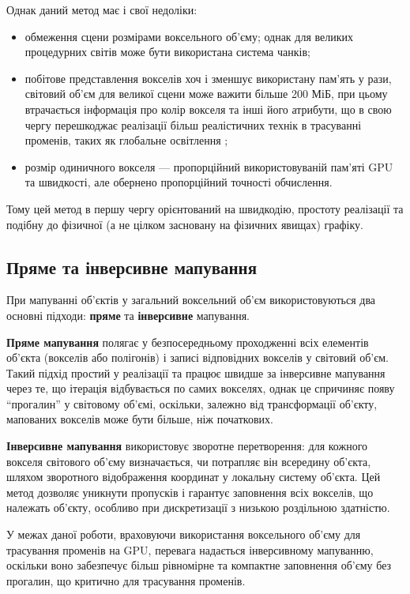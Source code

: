 Однак даний метод має і свої недоліки:
\begin{itemize}[itemsep=0pt, topsep=0pt, label=$\diamond$]
    \item обмеження сцени розмірами воксельного об'єму; однак для великих процедурних світів може бути використана система чанків;
    \item побітове представлення вокселів хоч і зменшує використану пам'ять у рази, світовий об'єм для великої сцени може важити більше 200 МіБ, при цьому втрачається інформація про колір вокселя та інші його атрибути, що в свою чергу перешкоджає реалізації більш реалістичних технік в трасуванні променів, таких як глобальне освітлення ;
    \item розмір одиничного вокселя --- пропорційний використовуваній пам'яті GPU та швидкості, але обернено пропорційний точності обчислення.
\end{itemize}

Тому цей метод в першу чергу орієнтований на швидкодію, простоту реалізації та подібну до фізичної (а не цілком засновану на фізичних явищах) графіку.

\subsection{Пряме та інверсивне мапування}

При мапуванні об’єктів у загальний воксельний об’єм використовуються два основні підходи: \textbf{пряме} та \textbf{інверсивне} мапування.

\textbf{Пряме мапування} полягає у безпосередньому проходженні всіх елементів об’єкта (вокселів або полігонів) і записі відповідних вокселів у світовий об’єм. Такий підхід простий у реалізації та працює швидше за інверсивне мапування через те, що ітерація відбувається по самих вокселях, однак це спричиняє появу ``прогалин'' у світовому об'ємі, оскільки, залежно від трансформації об'єкту, мапованих вокселів може бути більше, ніж початкових.

\textbf{Інверсивне мапування} використовує зворотне перетворення: для кожного вокселя світового об’єму визначається, чи потрапляє він всередину об'єкта, шляхом зворотного відображення координат у локальну систему об'єкта. Цей метод дозволяє уникнути пропусків і гарантує заповнення всіх вокселів, що належать об'єкту, особливо при дискретизації з низькою роздільною здат\-ністю.\cite{mapping}

У межах даної роботи, враховуючи використання воксельного об’єму для трасування променів на GPU, перевага надається інверсивному мапуванню, оскільки воно забезпечує більш рівномірне та компактне заповнення об’єму без прогалин, що критично для трасування променів.

